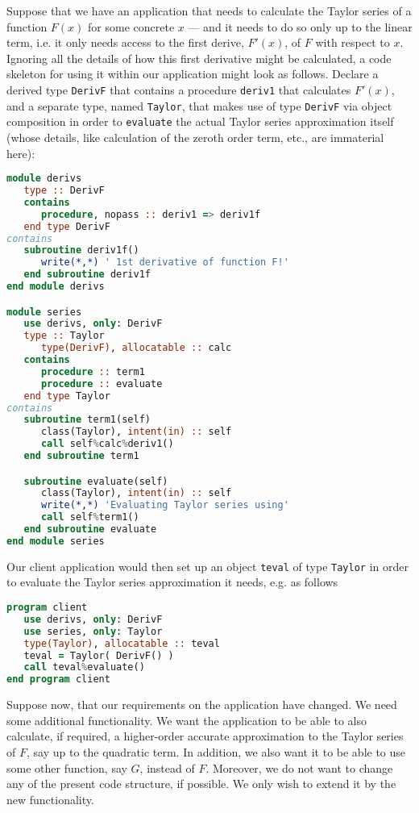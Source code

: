 \documentclass[11pt,oneside]{article}
\begin{document}
Suppose that we have an application that needs to calculate the Taylor
series of a function $F(x)$ for some concrete $x$ --- and it needs to
do so only up to the linear term, i.e. it only needs access to the
first derive, $F'(x)$, of $F$ with respect to $x$. Ignoring all the
details of how this first derivative might be calculated, a code
skeleton for using it within our application might look as
follows. Declare a derived type \texttt{DerivF} that contains a
procedure \texttt{deriv1} that calculates $F'(x)$, and a separate
type, named \texttt{Taylor}, that makes use of type \texttt{DerivF}
via object composition in order to \texttt{evaluate} the actual Taylor
series approximation itself (whose details, like calculation of the
zeroth order term, etc., are immaterial here):
\begin{lstlisting}[language=Fortran]
module derivs
   type :: DerivF
   contains
      procedure, nopass :: deriv1 => deriv1f
   end type DerivF
contains
   subroutine deriv1f()
      write(*,*) ' 1st derivative of function F!'
   end subroutine deriv1f
end module derivs

module series
   use derivs, only: DerivF
   type :: Taylor
      type(DerivF), allocatable :: calc
   contains
      procedure :: term1
      procedure :: evaluate
   end type Taylor
contains
   subroutine term1(self)
      class(Taylor), intent(in) :: self
      call self%calc%deriv1()
   end subroutine term1

   subroutine evaluate(self)
      class(Taylor), intent(in) :: self
      write(*,*) 'Evaluating Taylor series using'
      call self%term1()
   end subroutine evaluate   
end module series
\end{lstlisting}
Our client application would then set up an object \texttt{teval} of
type \texttt{Taylor} in order to evaluate the Taylor series
approximation it needs, e.g. as follows
\newpage
\begin{lstlisting}[language=Fortran]
program client
   use derivs, only: DerivF
   use series, only: Taylor
   type(Taylor), allocatable :: teval
   teval = Taylor( DerivF() )   
   call teval%evaluate()   
end program client
\end{lstlisting}

Suppose now, that our requirements on the application have changed.
We need some additional functionality. We want the application to be
able to also calculate, if required, a higher-order accurate
approximation to the Taylor series of $F$, say up to the quadratic
term. In addition, we also want it to be able to use some other
function, say $G$, instead of $F$. Moreover, we do not want to change
any of the present code structure, if possible. We only wish to extend
it by the new functionality.
\end{document}
